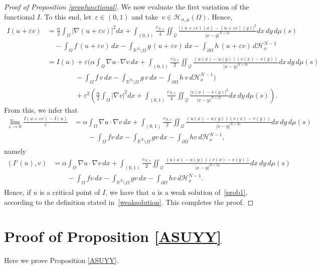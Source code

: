 \documentclass[12pt,a4paper,intlimits,sumlimits]{amsart}
\def \R {\mathbb{R}}
\def \Q {\mathcal Q}
\theoremstyle{definition}
\theoremstyle{plain}
\numberwithin{equation}{section}
\begin{document}
\begin{appendix}
\begin{proof}[Proof of Proposition \ref{propfunctional}]
We now evaluate the first variation of the functional $I$. To this end, let~$\varepsilon\in (0, 1)$ and take~$v\in \mathcal{H}_{\alpha, \mu}(\Omega)$. Hence,
\begin{align*}
I(u+\varepsilon v) &= \frac{\alpha}{2}\int_\Omega |\nabla (u+\varepsilon v)|^2 dx + \int_{(0, 1)} \frac{c_{N, s}}{4} \iint_{\Q} \frac{|(u+\varepsilon v)(x)-(u+\varepsilon v)(y)|^2}{|x-y|^{N+2s}} dx\,dy\, d\mu(s)\\
&\quad - \int_\Omega f \, (u+\varepsilon v) \, dx -\int_{\R^N\setminus\Omega} g \, (u+\varepsilon v) \, dx -\int_{\partial\Omega} h \, (u+\varepsilon v) \, d\mathscr{H}_x^{N-1}\\
&= I(u) +\varepsilon\Bigg(\alpha\int_\Omega \nabla u\cdot\nabla v \, dx +\int_{(0, 1)}\frac{c_{N, s}}{2} \iint_{\Q} \frac{(u(x)-u(y)) (v(x)-v(y))}{|x-y|^{N+2s}} dx\,dy\, d\mu(s)\\
&\qquad\qquad -\int_{\Omega} f\, v \, dx -\int_{\R^N\setminus\Omega} g \, v \, dx -\int_{\partial\Omega} h \, v \, d\mathscr{H}_x^{N-1} \Bigg)\\
&\qquad\qquad+\varepsilon^2 \left(\frac{\alpha}{2}\int_{\Omega} |\nabla v|^2 dx + \int_{(0, 1)}\frac{c_{N, s}}{4} \iint_{\Q}\frac{|v(x)-v(y)|^2}{|x-y|^{N+2s}} dx\,dy\, d\mu(s)\right).
\end{align*}
{F}rom this, we infer that
\begin{align*}
\lim_{\varepsilon\to 0} \frac{I(u+\varepsilon v) - I(u)}{\varepsilon} &= \alpha\int_\Omega \nabla u\cdot\nabla v \, dx +\int_{(0, 1)}\frac{c_{N, s}}{2} \iint_{\Q} \frac{(u(x)-u(y)) (v(x)-v(y))}{|x-y|^{N+2s}} dx\,dy\, d\mu(s)\\
& \qquad-\int_{\Omega} fv \, dx -\int_{\R^N\setminus\Omega} gv \, dx -\int_{\partial\Omega} hv \, d\mathscr{H}_x^{N-1},
\end{align*}
namely
\begin{align*}
(I'(u), v) & = \alpha\int_\Omega \nabla u\cdot\nabla v \, dx +\int_{(0, 1)}\frac{c_{N, s}}{2} \iint_{\Q} \frac{(u(x)-u(y)) (v(x)-v(y))}{|x-y|^{N+2s}} dx\,dy\, d\mu(s)\\
&\qquad -\int_{\Omega} fv \, dx -\int_{\R^N\setminus\Omega} gv \, dx -\int_{\partial\Omega} hv \, d\mathscr{H}_x^{N-1}.
\end{align*}
Hence, if $u$ is a critical point of $I$, we have that $u$ is a weak solution of~\eqref{prob1}, according to the definition stated in~\eqref{weaksolution}. This completes the proof.
\end{proof}

\section{Proof of Proposition \ref{ASUYY}}\label{appendixASUYY}
Here we prove Proposition \ref{ASUYY}.


\end{appendix}
\end{document}
